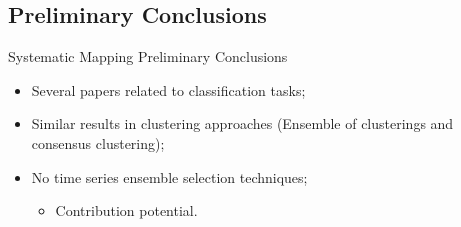 \documentclass{beamer}
\begin{document}
\subsection{Preliminary Conclusions}
\begin{frame}{Systematic Mapping Preliminary Conclusions}
  \begin{itemize}
  \item Several papers related to classification tasks;
  \item Similar results in clustering approaches (Ensemble of clusterings and consensus clustering);
  \item No time series ensemble selection techniques;
    \begin{itemize}
    \item Contribution potential.
    \end{itemize}
  \end{itemize}
\end{frame}

\section{}
\begin{frame}
  \titlepage
\end{frame}
\end{document}
